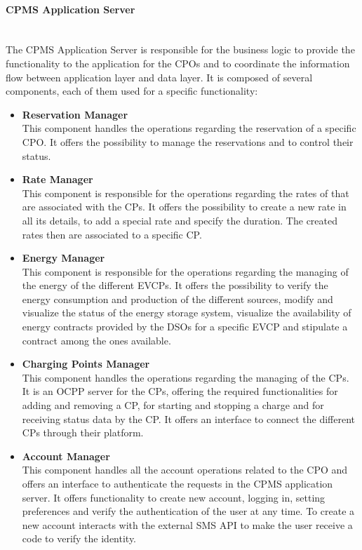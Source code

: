 \paragraph*{CPMS Application Server} \hfill \\
The CPMS Application Server is responsible for the business logic to provide the functionality to the application for the CPOs and to coordinate the information flow between application layer and data layer.
It is composed of several components, each of them used for a specific functionality:\\
\begin{itemize}
    \item \textbf{Reservation Manager} \\
    This component handles the operations regarding the reservation of a specific CPO. It offers the possibility to manage the reservations and to control their status.
    \item \textbf{Rate Manager} \\ This component is responsible for the operations regarding the rates of that are associated with the CPs. It offers the possibility to
    create a new rate in all its details, to add a special rate and specify the duration. The created rates then are associated to a specific CP.
    \item \textbf{Energy Manager} \\ This component is responsible for the operations regarding the managing of the energy of the different EVCPs. 
    It offers the possibility to verify the energy consumption and production of the different sources, modify and visualize the status of the energy storage system,
    visualize the availability of energy contracts provided by the DSOs for a specific EVCP and stipulate a contract among the ones available.
    \item \textbf{Charging Points Manager} \\ This component handles the operations regarding the managing of the CPs. It is an OCPP server for the CPs, offering the 
    required functionalities for adding and removing a CP, for starting and stopping a charge and for receiving status data by the CP. It offers an interface to connect the different CPs through their platform.
    \item \textbf{Account Manager} \\ This component handles all the account operations related to the CPO and offers an interface to authenticate the requests in the CPMS application server.
          It offers functionality to create new account, logging in, setting preferences and verify the authentication of the user at any time.
          To create a new account interacts with the external SMS API to make the user receive a code to verify the identity.
\end{itemize}


